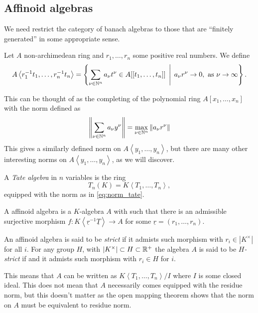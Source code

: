 \subsection{Affinoid algebras} \label{sec:affinoid_algebras}
We need restrict the category of banach algebras to those that are ``finitely generated'' in some appropriate sense. 

\begin{definition}
	Let $A$ non-archimedean ring and $r_1, \ldots, r_n$ some positive real numbers. We define \[
		A \left<r_1^{-1}t_1, \ldots, r_{n}^{-1} t_n \right> = \left\{\sum_{\nu \in \N^{n}}^{} a_\nu t^{\nu} \in A[[t_1,\ldots, t_n]]\st a_\nu r^{\nu} \to 0, \text{ as } \nu \to \infty\right\} 
	.\] 
\end{definition}
This can be thought of as the completing of the polynomial ring $A[x_1, \ldots, x_n]$ with the norm defined as 
\begin{equation}\label{eq:norm_tate}
	\left\| \sum_{\nu \in \mathbb{N}^{n}} a_\nu y^{\nu}\right\| = \max_{\nu \in \mathbb{N}^{n}} \|a_\nu r^{\nu}\|
\end{equation}
This gives a similarly defined norm on $A\left<y_1, \ldots, y_n \right>$, but there are many other interesting norms on $A \left<y_1, \ldots, y_n \right>$, as we will discover. 

\begin{definition}
	A \emph{Tate algebra} in $n$ variables is the ring \[
		T_n(K) = K\left<T_1, \ldots, T_n \right>
	,\]
	equipped with the norm as in \eqref{eq:norm_tate}.
\end{definition}


\begin{definition}
	A affinoid algebra is a $K$-algebra $A$ with such that there is an admissible surjective morphism $f: K\left<\underline r ^{-1} \underline T \right> \to A$ for some $\underline r = (r_1, \ldots, r_n)$. 

	An affinoid algebra is said to be \emph{strict} if it admists such morphism with $r_i  \in |K^{\times }|$ for all $i$. 
	For any group $H$, with $|K^{\times }| \subset  H \subset \mathbb{R}^{ +}$ the algebra $A$ is said to be \emph{$H$-strict} if and it admists such morphism with $r_i \in H$ for $i$. 
\end{definition}
This means that $A$ can be written as $K\left<T_1, \ldots, T_n \right> / I$ where $I$ is some closed ideal.
This does not mean that $A$ necessarily comes equipped with the residue norm, but this doesn't matter as the open mapping theorem shows that the norm on $A$ must be equivalent to residue norm.

